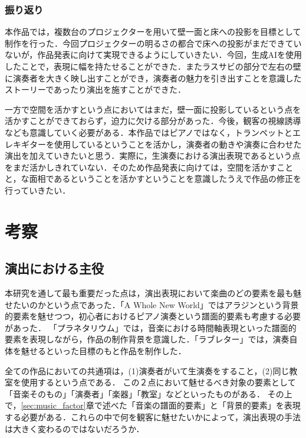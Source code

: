 \subsubsection{振り返り}
本作品では，複数台のプロジェクターを用いて壁一面と床への投影を目標として制作を行った．今回プロジェクターの明るさの都合で床への投影がまだできていないが，作品発表に向けて実現できるようにしていきたい．今回，生成AIを使用したことで，表現に幅を持たせることができた．またラスサビの部分で左右の壁に演奏者を大きく映し出すことができ，演奏者の魅力を引き出すことを意識したストーリーであったり演出を施すことができた．

一方で空間を活かすという点においてはまだ，壁一面に投影しているという点を活かすことができておらず，迫力に欠ける部分があった．今後，観客の視線誘導なども意識していく必要がある．本作品ではピアノではなく，トランペットとエレキギターを使用しているということを活かし，演奏者の動きや演奏に合わせた演出を加えていきたいと思う．実際に，生演奏における演出表現であるという点をまだ活かしきれていない．そのため作品発表に向けては，空間を活かすことと，な面相であるということを活かすということを意識したうえで作品の修正を行っていきたい．


\section{考察}
\subsection{演出における主役}
本研究を通して最も重要だった点は，演出表現において楽曲のどの要素を最も魅せたいのかという点であった．「A Whole New World」ではアラジンという背景的要素を魅せつつ，初心者におけるピアノ演奏という譜面的要素も考慮する必要があった．
「プラネタリウム」では，音楽における時間軸表現といった譜面的要素を表現しながら，作品の制作背景を意識した．「ラブレター」では，演奏自体を魅せるといった目標のもと作品を制作した．

全ての作品においての共通項は，(1)演奏者がいて生演奏をすること，(2)同じ教室を使用するという点である．
この２点において魅せるべき対象の要素として「音楽そのもの」「演奏者」「楽器」「教室」などといったものがある．
その上で，\ref{sec:music_factor}章で述べた「音楽の譜面的要素」と「背景的要素」を表現する必要がある．これらの中で何を観客に魅せたいかによって，演出表現の手法は大きく変わるのではないだろうか．



